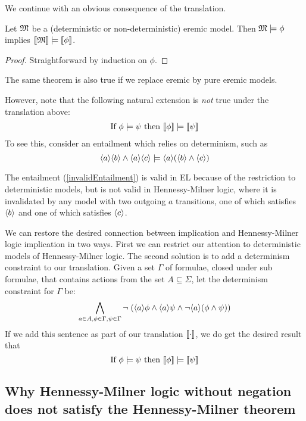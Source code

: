 We continue with an obvious consequence of the translation.

\begin{theorem}
Let $\frak{M}$ be a (deterministic or non-deterministic) eremic
  model. Then $\frak{M} \models \phi$ implies $\lbrack\!\lbrack \frak{M} \rbrack\!\rbrack \models
  \lbrack\!\lbrack \phi \rbrack\!\rbrack$.
\end{theorem}
\begin{proof}
Straightforward by induction on $\phi$.
\end{proof}

\NI The same theorem is also true if we replace eremic by pure eremic
models.

However, note that the following natural extension is \emph{not} true
under the translation above:
\begin{align}
\text{If } \phi \models \psi \text{ then } \lbrack\!\lbrack \phi \rbrack\!\rbrack \models \lbrack\!\lbrack \psi \rbrack\!\rbrack
\label{invalidEntailment}
\end{align}
To see this, consider an entailment which relies on determinism, such as
\[
\langle a \rangle \langle b \rangle \land \langle a \rangle \langle c \rangle \models \langle a \rangle (\langle b \rangle \land \langle c \rangle )
\]

\NI The entailment (\ref{invalidEntailment}) is valid in EL because of
the restriction to deterministic models, but is not valid in
Hennessy-Milner logic, where it is invalidated by any model with two
outgoing $a$ transitions, one of which satisfies $\MAY{b}$ and one of
which satisfies $\MAY{c}$.

We can restore the desired connection between \ELABR{} implication and
Hennessy-Milner logic implication in two ways. First we can restrict
our attention to deterministic models of Hennessy-Milner logic.  The
second solution is to add a determinism constraint to our
translation. Given a set $\Gamma$ of \ELABR{} formulae, closed under
sub formulae, that contains actions from the set $A \subseteq \Sigma$,
let the determinism constraint for $\Gamma$ be:
\[
\bigwedge_{a \in A, \phi \in \Gamma, \psi \in \Gamma} \neg \; (\langle a \rangle \phi \land \langle a \rangle \psi \land \neg \langle a \rangle (\phi \land \psi) )
\]
If we add this sentence as part of our translation $\lbrack\!\lbrack \cdot \rbrack\!\rbrack$, we
do get the desired result that
\[
\text{If } \phi \models \psi \text{ then } \lbrack\!\lbrack \phi \rbrack\!\rbrack \models \lbrack\!\lbrack \psi \rbrack\!\rbrack
\]


\subsection{Why Hennessy-Milner logic without negation does not satisfy 
the Hennessy-Milner theorem}

